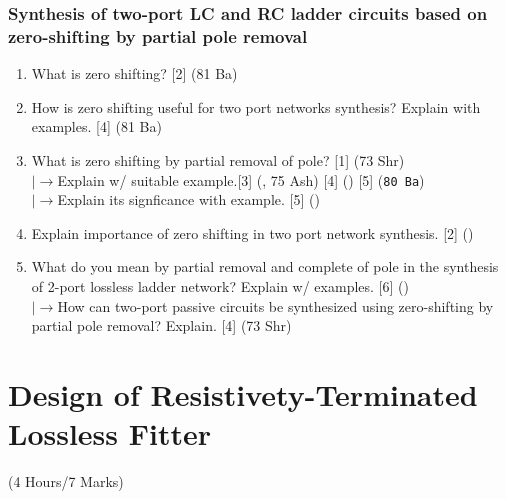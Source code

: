 \documentclass[12pt]{article}
\newcommand{\lb}{\\$\left|\rightarrow\right.$}
\begin{document}
		\subsubsection{Synthesis of two-port LC and RC ladder circuits based on zero-shifting by partial pole removal}
			\begin{enumerate}
				\item What is zero shifting? \hfill [2] (81 Ba)
				
				\item How is zero shifting useful for two port networks synthesis? Explain with examples. \hfill [4] (81 Ba)
				
				\item What is zero shifting by partial removal of pole? \hfill [1] (73 Shr)
				\lb Explain w/ suitable example.\hfill [3] (, 75 Ash) [4] () [5] (\texttt{80 Ba})
				\lb Explain its signficance with example. \hfill [5] ()
				
				\item Explain importance of zero shifting in two port network synthesis. \hfill [2] ()

				\item What do you mean by partial removal and complete of pole in the synthesis of 2-port lossless ladder network? Explain w/ examples. \hfill [6] ()
				\lb How can two-port passive circuits be synthesized using zero-shifting by partial pole removal? Explain. \hfill [4] (73 Shr)
			\end{enumerate}

	\pagebreak
\section{Design of Resistivety-Terminated Lossless Fitter}
	\begin{center}(4 Hours/7 Marks)\end{center}
\end{document}
